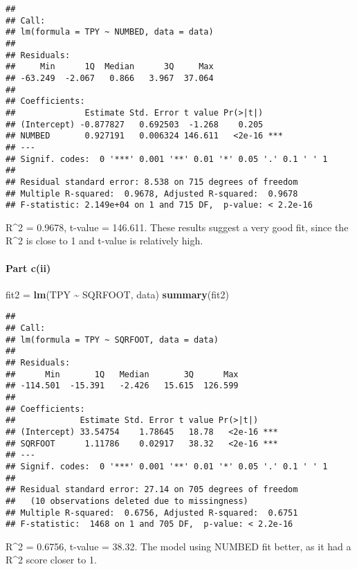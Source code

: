 \documentclass[
]{article}
\newenvironment{Shaded}{\begin{snugshade}}{\end{snugshade}}
\newcommand{\FunctionTok}[1]{\textcolor[rgb]{0.13,0.29,0.53}{\textbf{#1}}}
\newcommand{\NormalTok}[1]{#1}
\newcommand{\OtherTok}[1]{\textcolor[rgb]{0.56,0.35,0.01}{#1}}
\newcommand{\SpecialCharTok}[1]{\textcolor[rgb]{0.81,0.36,0.00}{\textbf{#1}}}
\begin{document}
\begin{verbatim}
## 
## Call:
## lm(formula = TPY ~ NUMBED, data = data)
## 
## Residuals:
##     Min      1Q  Median      3Q     Max 
## -63.249  -2.067   0.866   3.967  37.064 
## 
## Coefficients:
##              Estimate Std. Error t value Pr(>|t|)    
## (Intercept) -0.877827   0.692503  -1.268    0.205    
## NUMBED       0.927191   0.006324 146.611   <2e-16 ***
## ---
## Signif. codes:  0 '***' 0.001 '**' 0.01 '*' 0.05 '.' 0.1 ' ' 1
## 
## Residual standard error: 8.538 on 715 degrees of freedom
## Multiple R-squared:  0.9678, Adjusted R-squared:  0.9678 
## F-statistic: 2.149e+04 on 1 and 715 DF,  p-value: < 2.2e-16
\end{verbatim}

R\^{}2 = 0.9678, t-value = 146.611. These results suggest a very good
fit, since the R\^{}2 is close to 1 and t-value is relatively high.

\hypertarget{part-cii}{%
\paragraph{Part c(ii)}\label{part-cii}}

\begin{Shaded}
\begin{Highlighting}[]
\NormalTok{fit2 }\OtherTok{=} \FunctionTok{lm}\NormalTok{(TPY }\SpecialCharTok{\textasciitilde{}}\NormalTok{ SQRFOOT, data)}
\FunctionTok{summary}\NormalTok{(fit2)}
\end{Highlighting}
\end{Shaded}

\begin{verbatim}
## 
## Call:
## lm(formula = TPY ~ SQRFOOT, data = data)
## 
## Residuals:
##      Min       1Q   Median       3Q      Max 
## -114.501  -15.391   -2.426   15.615  126.599 
## 
## Coefficients:
##             Estimate Std. Error t value Pr(>|t|)    
## (Intercept) 33.54754    1.78645   18.78   <2e-16 ***
## SQRFOOT      1.11786    0.02917   38.32   <2e-16 ***
## ---
## Signif. codes:  0 '***' 0.001 '**' 0.01 '*' 0.05 '.' 0.1 ' ' 1
## 
## Residual standard error: 27.14 on 705 degrees of freedom
##   (10 observations deleted due to missingness)
## Multiple R-squared:  0.6756, Adjusted R-squared:  0.6751 
## F-statistic:  1468 on 1 and 705 DF,  p-value: < 2.2e-16
\end{verbatim}

R\^{}2 = 0.6756, t-value = 38.32. The model using NUMBED fit better, as
it had a R\^{}2 score closer to 1.
\end{document}
